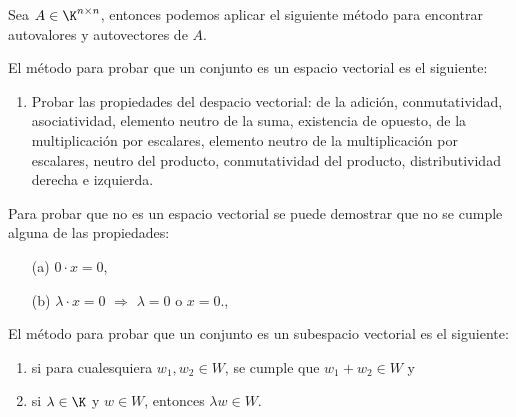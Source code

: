 \documentclass[a4,10pt]{aleph-notas}
\begin{document}
\begin{obs}
    Sea $A\in \K^{n \times n}$, entonces podemos aplicar el siguiente método para encontrar autovalores y autovectores de $A$.
\end{obs}

\begin{obs}
    El método para probar que un conjunto es un espacio vectorial es el siguiente:
    \begin{enumerate}
        \item Probar las propiedades del despacio vectorial: de la adición, conmutatividad, asociatividad, elemento neutro de la suma, existencia de opuesto, de la multiplicación por escalares, elemento neutro de la multiplicación por escalares, neutro del producto, conmutatividad del producto, distributividad derecha e izquierda. 
    \end{enumerate}
    \item Para probar que no es un espacio vectorial se puede demostrar que no se cumple alguna de las propiedades:
    \begin{itemize}
        \item[(a)] $0\cdot x = 0$,
        \item[(b)] $\lambda \cdot x = 0$ $\Rightarrow$ $\lambda = 0$ o $x = 0$.,
    \end{itemize}
\end{obs}

\begin{obs}
    El método para probar que un conjunto es un subespacio vectorial es el siguiente:
    \begin{enumerate}[label=\textit{\alph*)},ref=\textit{\alph*)}]
        \item\label{def-sub-a} si para cualesquiera $w_1,w_2 \in W$, se cumple que $w_1+w_2 \in W$ y
        \item\label{def-sub-b} si $\lambda \in \K$ y  $w \in W$, entonces $\lambda w \in W$.
    \end{enumerate}
\end{obs}
\end{document}
